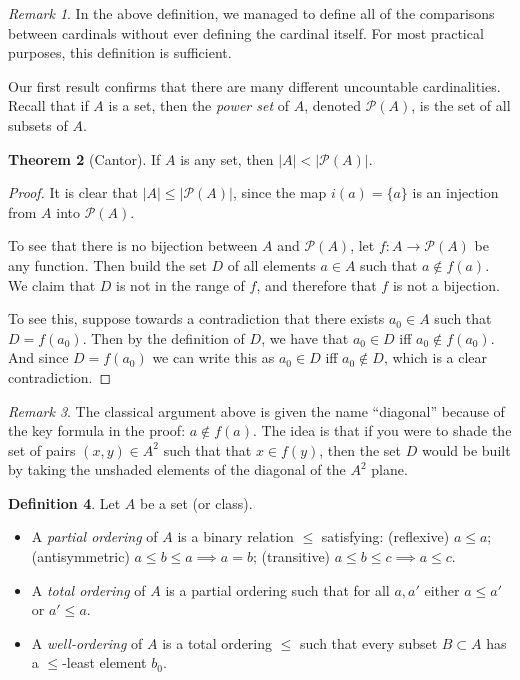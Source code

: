 \documentclass[11pt,oneside]{amsart}
\theoremstyle{definition}
\newtheorem{thm}{Theorem}[section]
\theoremstyle{definition}
\newtheorem{defn}[thm]{Definition}
\theoremstyle{remark}
\newtheorem{rem}[thm]{Remark}
\begin{document}
\begin{rem}
  In the above definition, we managed to define all of the comparisons between cardinals without ever defining the cardinal itself. For most practical purposes, this definition is sufficient.
\end{rem}

Our first result confirms that there are many different uncountable cardinalities. Recall that if $A$ is a set, then the \emph{power set} of $A$, denoted $\mathcal P(A)$, is the set of all subsets of $A$.

\begin{thm}[Cantor]
  If $A$ is any set, then $|A|<|\mathcal P(A)|$.
\end{thm}

\begin{proof}
  It is clear that $|A|\leq|\mathcal P(A)|$, since the map $i(a)=\{a\}$ is an injection from $A$ into $\mathcal P(A)$.

  To see that there is no bijection between $A$ and $\mathcal P(A)$, let $f\colon A\to\mathcal P(A)$ be any function. Then build the set $D$ of all elements $a\in A$ such that $a\notin f(a)$. We claim that $D$ is not in the range of $f$, and therefore that $f$ is not a bijection.

  To see this, suppose towards a contradiction that there exists $a_0\in A$ such that $D=f(a_0)$. Then by the definition of $D$, we have that $a_0\in D$ iff $a_0\notin f(a_0)$. And since $D=f(a_0)$ we can write this as $a_0\in D$ iff $a_0\notin D$, which is a clear contradiction.
\end{proof}

\begin{rem}
  The classical argument above is given the name ``diagonal'' because of the key formula in the proof: $a\notin f(a)$. The idea is that if you were to shade the set of pairs $(x,y)\in A^2$ such that that $x\in f(y)$, then the set $D$ would be built by taking the unshaded elements of the diagonal of the $A^2$ plane.
\end{rem}

\begin{defn}
  Let $A$ be a set (or class).
  \begin{itemize}
  \item A \emph{partial ordering} of $A$ is a binary relation $\leq$ satisfying: (reflexive) $a\leq a$; (antisymmetric) $a\leq b\leq a\implies a=b$; (transitive) $a\leq b\leq c\implies a\leq c$.
  \item A \emph{total ordering} of $A$ is a partial ordering such that for all $a,a'$ either $a\leq a'$ or $a'\leq a$.
  \item A \emph{well-ordering} of $A$ is a total ordering $\leq$ such that every subset $B\subset A$ has a $\leq$-least element $b_0$.
  \end{itemize}
\end{defn}
\end{document}
